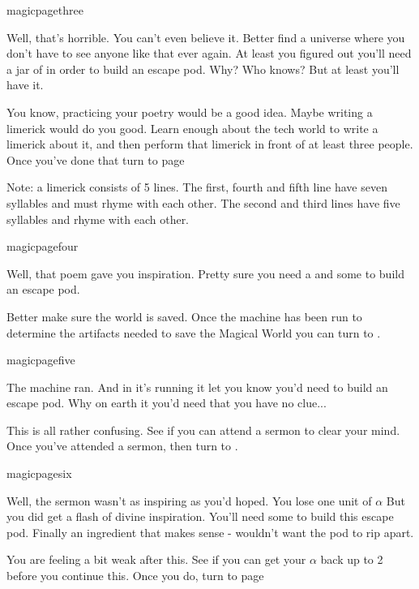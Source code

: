 \documentclass[greennotebook]{guildcamp3} %
\begin{document}
\begin{page}[oh my...]{magicpagethree}
	
Well, that's horrible. You can't even believe it. Better find a universe where you don't have to see anyone like that ever again. At least you figured out you'll need a jar of \iStardust{} in order to build an escape pod. Why? Who knows? But at least you'll have it. 

You know, practicing your poetry would be a good idea. Maybe writing a limerick would do you good. Learn enough about the tech world to write a limerick about it, and then perform that limerick in front of at least three people. Once you've done that turn to page 

Note: a limerick consists of 5 lines. The first, fourth and fifth line have seven syllables and must rhyme with each other. The second and third lines have five syllables and rhyme with each other. 
	
\end{page}

\begin{page}{magicpagefour}
	
Well, that poem gave you inspiration. Pretty sure you need a \iWerewolfFang{} and some \iHolyWater{} to build an escape pod.  

Better make sure the world is saved. Once the machine has been run to determine the artifacts needed to save the Magical World you can turn to .
	
\end{page}

\begin{page}[ok, it ran...]{magicpagefive}
	
The machine ran. And in it's running it let you know you'd need \iBelladonna{} to build an escape pod. Why on earth it you'd need that you have no clue...

This is all rather confusing. See if you can attend a sermon to clear your mind. Once you've attended a sermon, then turn to .
	
\end{page}

\begin{page}[alleluia!]{magicpagesix}
	
Well, the sermon wasn't as inspiring as you'd hoped. You lose one unit of $\alpha$ But you did get a flash of divine inspiration. You'll need some \iDragonSkin{} to build this escape pod. Finally an ingredient that makes sense - wouldn't want the pod to rip apart. 

You are feeling a bit weak after this. See if you can get your $\alpha$ back up to 2 before you continue this. Once you do, turn to page 
	
\end{page}
\end{document}

